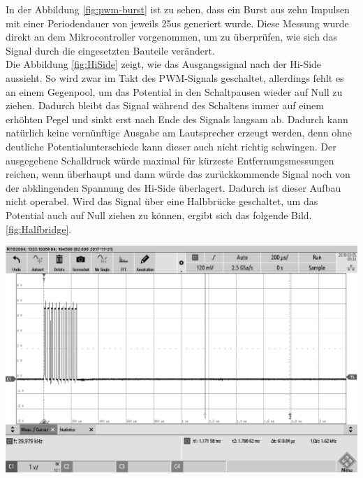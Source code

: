 In der Abbildung \ref{fig:pwm-burst} ist zu sehen, dass ein Burst aus zehn Impulsen mit einer Periodendauer von jeweils 25us generiert wurde. Diese Messung wurde direkt an dem Mikrocontroller vorgenommen, um zu überprüfen, wie sich das Signal durch die eingesetzten Bauteile verändert.\\
Die Abbildung \ref{fig:HiSide} zeigt, wie das Ausgangssignal nach der Hi-Side aussieht. So wird zwar im Takt des PWM-Signals geschaltet, allerdings fehlt es an einem Gegenpool, um das Potential in den Schaltpausen wieder auf Null zu ziehen. Dadurch bleibt das Signal während des Schaltens immer auf einem erhöhten Pegel und sinkt erst nach Ende des Signals langsam ab. Dadurch kann natürlich keine vernünftige Ausgabe am Lautsprecher erzeugt werden, denn ohne deutliche Potentialunterschiede kann dieser auch nicht richtig schwingen. Der ausgegebene Schalldruck würde maximal für kürzeste Entfernungsmessungen reichen, wenn überhaupt und dann würde das zurückkommende Signal noch von der abklingenden Spannung des Hi-Side überlagert. Dadurch ist dieser Aufbau nicht operabel.\newpage
Wird das Signal über eine Halbbrücke geschaltet, um das Potential auch auf Null ziehen zu können, ergibt sich das folgende Bild. \ref{fig:Halfbridge}.\\
\begin{minipage}{0.5\textwidth}
\includegraphics[width=1\textwidth, draft
]{Abbildungen/MessungenP1/PWM-Nach-der-Halbbrucke.png}
\label{fig:Halfbridge}
\end{minipage}
